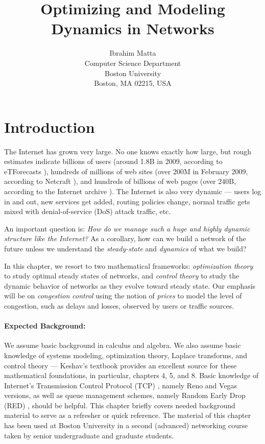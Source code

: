 \documentclass{article}
\title{Optimizing and Modeling Dynamics in Networks}
\author{{\sc Ibrahim Matta} \\
Computer Science Department \\
Boston University \\
Boston, MA 02215, USA}
\date{}							%
\begin{document}
\maketitle


\section{Introduction}

The Internet has grown very large. No one knows exactly how large, but rough estimates indicate billions of users (around 1.8B in 2009, according to eTForecasts \cite{eTForecasts}), hundreds of millions of web sites (over 200M in February 2009, according to Netcraft \cite{Netcraft}), and hundreds of billions of web pages (over 240B, according to the Internet archive \cite{Internet-archive}).
The Internet is also very dynamic --- users log in and out, new services get added, routing policies change, normal traffic gets mixed with denial-of-service (DoS) attack traffic, etc.

An important question is: {\em How do we manage such a huge and highly dynamic structure like the Internet?}
As a corollary, how can we build a network of the future unless we understand the {\em steady-state} and {\em dynamics} of what we build?

In this chapter, we resort to two mathematical frameworks: {\em optimization theory} to study optimal steady states of networks, and {\em control theory} to study the dynamic behavior of networks as they evolve toward steady state. Our emphasis will be on {\em congestion control} using the notion of {\em prices} to model the level of congestion, such as delays and losses, observed by users or traffic sources.

\paragraph{Expected Background:} We assume basic background in calculus and algebra.
We also assume basic knowledge of systems modeling, optimization theory, Laplace transforms, and control theory --- Keshav's textbook \cite{Keshav:2010} provides an excellent source for these mathematical foundations,
in particular, chapters 4, 5, and 8.
Basic knowledge of Internet's Transmission Control Protocol (TCP) \cite{tcp:1988},
namely Reno and Vegas \cite{vegas:1995} versions,
as well as queue management schemes, namely Random Early Drop (RED) \cite{red:1993},
should be helpful.
This chapter briefly covers needed background material to serve as a refresher or quick reference.
The material of this chapter has been used at Boston University in a second (advanced) networking course
taken by senior undergraduate and graduate students.
\end{document}
